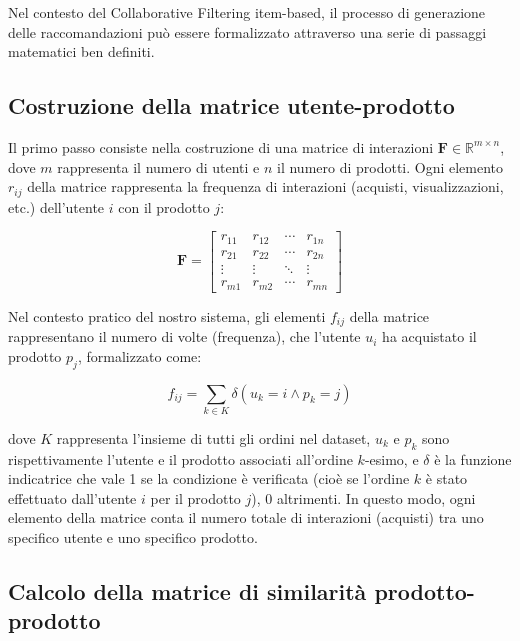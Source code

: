 Nel contesto del Collaborative Filtering item-based, il processo di generazione delle raccomandazioni può essere formalizzato attraverso una serie di passaggi matematici ben definiti.

\subsection{Costruzione della matrice utente-prodotto}
\label{sec:collaborative-filtering-matrice-utenti-prodotti}

Il primo passo consiste nella costruzione di una matrice di interazioni $\mathbf{F} \in \mathbb{R}^{m \times n}$, dove $m$ rappresenta il numero di utenti e $n$ il numero di prodotti. Ogni elemento $r_{ij}$ della matrice rappresenta la frequenza di interazioni (acquisti, visualizzazioni, etc.) dell'utente $i$ con il prodotto $j$:

\begin{equation}
\mathbf{F} = \begin{bmatrix}
r_{11} & r_{12} & \cdots & r_{1n} \\
r_{21} & r_{22} & \cdots & r_{2n} \\
\vdots & \vdots & \ddots & \vdots \\
r_{m1} & r_{m2} & \cdots & r_{mn}
\end{bmatrix}
\end{equation}

Nel contesto pratico del nostro sistema, gli elementi $f_{ij}$ della matrice rappresentano il numero di volte (frequenza), che l'utente $u_i$ ha acquistato il prodotto $p_j$, formalizzato come:

\begin{equation}
f_{ij} = \sum_{k \in K} \delta(u_k = i \land p_k = j)
\end{equation}

dove $K$ rappresenta l'insieme di tutti gli ordini nel dataset, $u_k$ e $p_k$ sono rispettivamente l'utente e il prodotto associati all'ordine $k$-esimo, e $\delta$ è la funzione indicatrice che vale 1 se la condizione è verificata (cioè se l'ordine $k$ è stato effettuato dall'utente $i$ per il prodotto $j$), 0 altrimenti. In questo modo, ogni elemento della matrice conta il numero totale di interazioni (acquisti) tra uno specifico utente e uno specifico prodotto.

\subsection{Calcolo della matrice di similarità prodotto-prodotto}


